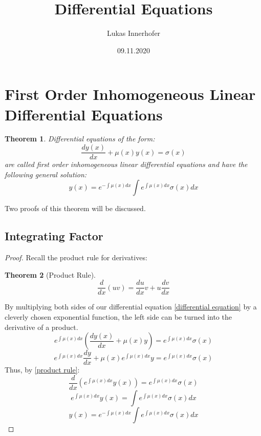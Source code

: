\documentclass{article}
\title{Differential Equations}
\author{Lukas Innerhofer}
\date{09.11.2020}
\begin{document}
    \maketitle

    \section{First Order Inhomogeneous Linear Differential Equations}
    \newtheorem{theorem}{Theorem}[section]
    \begin{theorem}
        Differential equations of the form:
        \begin{equation} \label{differential equation}
            \frac{dy(x)}{dx}+\mu(x)y(x) = \sigma(x)
        \end{equation}
        are called first order inhomogeneous linear differential equations and 
        have the following general solution:
        \begin{equation} \label{general solution}
            y(x) = e^{-\int \mu(x)dx} \int e^{\int \mu(x)dx} \sigma(x) dx
        \end{equation}
    \end{theorem}
    Two proofs of this theorem will be discussed.

    \subsection{Integrating Factor}
    \begin{proof}

        Recall the product rule for derivatives:
        \begin{theorem}[Product Rule]
            \begin{equation} \label{product rule}
                \frac{d}{dx}(uv)=\frac{du}{dx}v+u\frac{dv}{dx}
            \end{equation}
        \end{theorem}
        By multiplying both sides of our differential equation \ref{differential equation} by a cleverly chosen
        exponential function, the left side can be turned into the derivative of 
        a product.
        \[ e^{\int \mu(x)dx} (\frac{dy(x)}{dx}+\mu(x)y) = e^{\int \mu(x)dx} \sigma(x) \]
        \[ e^{\int \mu(x)dx}\frac{dy}{dx} + \mu(x)e^{\int \mu(x)dx}y = e^{\int \mu(x)dx} \sigma(x) \]
        Thus, by \ref{product rule}:
        \[ \frac{d}{dx}(e^{\int \mu(x)dx}y(x)) = e^{\int \mu(x)dx} \sigma(x) \]
        \[ e^{\int \mu(x)dx}y(x) = \int e^{\int \mu(x)dx} \sigma(x) dx \]
        \[ y(x) = e^{-\int \mu(x)dx} \int e^{\int \mu(x)dx} \sigma(x) dx \]
    \end{proof}
\end{document}
